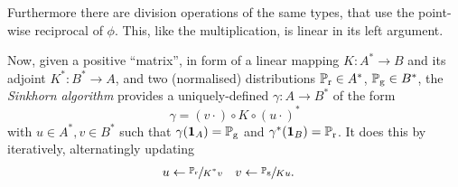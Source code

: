\documentclass[a4paper]{easychair}
\begin{document}
Furthermore there are division operations of the same types, that use the point-wise reciprocal of $\phi$. This, like the multiplication, is linear in its left argument.

Now, given a positive “matrix”, in form of a linear mapping $K: A^\ast\to B$ and its adjoint $K^\ast: B^\ast\to A$, and two (normalised) distributions $\mathbb{P}_\mathrm{r}\in A^\ast$, $\mathbb{P}_\mathrm{g}\in B^\ast$, the \emph{Sinkhorn algorithm}\cite{SinkhornDiagEquivlc} provides a uniquely-defined $\gamma: A\to B^\ast$ of the form
\[
  \gamma = (v\cdot) \circ K \circ (u\cdot)^\ast
\]
with $u\in A^\ast, v\in B^\ast$ such that $\gamma(\mathbf{1}_A)=\mathbb{P}_\mathrm{g}$ and $\gamma^\ast(\mathbf{1}_B)=\mathbb{P}_\mathrm{r}$. It does this by iteratively, alternatingly updating
\[\begin{aligned}
  u &\leftarrow \sfrac{\mathbb{P}_\mathrm{r}}{K^\ast v}
   & v &\leftarrow \sfrac{\mathbb{P}_\mathrm{g}}{K u}.
\end{aligned}\]



%
%

%
%
%



\end{document}
